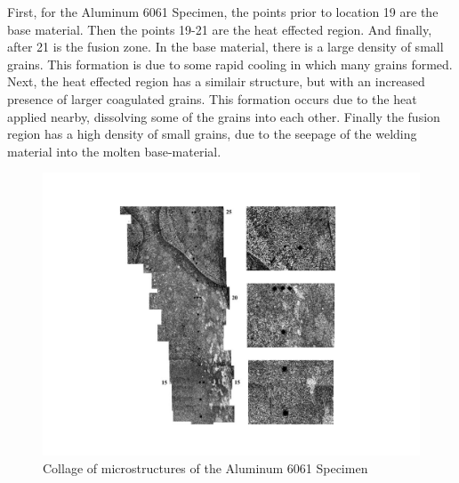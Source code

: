 \documentclass{article}
\begin{document}
\newpage
First, for the Aluminum 6061 Specimen, the points prior to location 19 are the base material. Then the points 19-21 are the heat effected region. And finally, after 21 is the fusion zone. In the base material, there is a large density of small grains. This formation is due to some rapid cooling in which many grains formed. Next, the heat effected region has a similair structure, but with an increased presence of larger coagulated grains. This formation occurs due to the heat applied nearby, dissolving some of the grains into each other. Finally the fusion region has a high density of small grains, due to the seepage of the welding material into the molten base-material. 
\begin{figure}[!hp!]
    \centering
    \includegraphics[width=1\linewidth]{plots/6061microcollage.png}
    \caption{Collage of microstructures of the Aluminum 6061 Specimen}
    \label{fig:6061}
\end{figure}
\end{document}
